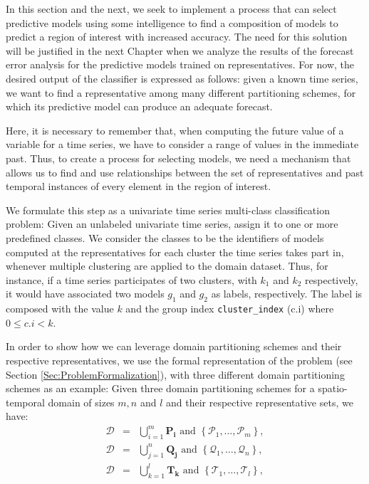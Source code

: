 In this section and the next, we seek to implement a process that can select predictive models using some intelligence to find a composition of models to predict a region of interest with increased accuracy. The need for this solution will be justified in the next Chapter when we analyze the results of the forecast error analysis for the predictive models trained on representatives. For now, the desired output of the classifier is expressed as follows: given a known time series, we want to find a representative among many different partitioning schemes, for which its predictive model can produce an adequate forecast.

Here, it is necessary to remember that, when computing the future value of a variable for a time series, we have to consider a range of values in the immediate past\cite{Chatfield2001}. Thus, to create a process for selecting models, we need a mechanism that allows us to find and use relationships between the set of representatives and past temporal instances of every element in the region of interest.

We formulate this step as a univariate time series multi-class classification problem: Given an unlabeled univariate time series, assign it to one or more predefined classes. We consider the classes to be the identifiers of models computed at the representatives for each cluster the time series takes part in, whenever multiple clustering are applied to the domain dataset. Thus, for instance, if a time series participates of two clusters, with $k_1$ and $k_2$ respectively, it would have associated two models $g_1$ and $g_2$ as labels, respectively.
The label is composed with the value $k$ and the group index \texttt{cluster\_index} (c.i) where $0 \leq c.i <k$. 

In order to show how we can leverage domain partitioning schemes and their respective representatives, we use the formal representation of the problem (see Section \ref{Sec:ProblemFormalization}), with three different domain partitioning schemes as an example: Given three domain partitioning schemes for a spatio-temporal domain of sizes $m, n$ and $l$ and their respective representative sets, we have:
\begin{eqnarray} 
\nonumber
\mathcal{D}	& = & \bigcup_{i=1}^{m} \mathbf{P_i} \,\,\textrm{and} \,\, \left\{\mathcal{P}_{1}, \ldots, \mathcal{P}_{m}\right\}, \\ \nonumber
\mathcal{D} & = & \bigcup_{j=1}^{n} \mathbf{Q_j} \,\,\textrm{and} \,\, \left\{\mathcal{Q}_{1}, \ldots, \mathcal{Q}_{n}\right\}, \\ \nonumber 
\mathcal{D} & = & \bigcup_{k=1}^{l} \mathbf{T_k} \,\,\textrm{and} \,\, \left\{\mathcal{T}_{1}, \ldots, \mathcal{T}_{l}\right\},
\end{eqnarray}

